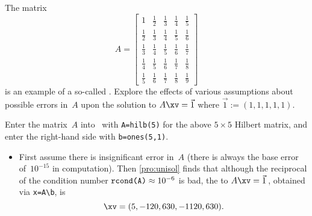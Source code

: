\begin{example} \label{eg:hilb5}
The matrix 
\begin{equation*}
A=\begin{bmatrix} 1&\frac12&\frac13&\frac14&\frac15
\\\frac12&\frac13&\frac14&\frac15&\frac16
\\\frac13&\frac14&\frac15&\frac16&\frac17
\\\frac14&\frac15&\frac16&\frac17&\frac18
\\\frac15&\frac16&\frac17&\frac18&\frac19
\end{bmatrix}
\end{equation*}
is an example of a so-called .
Explore the effects of various assumptions about possible errors in~\(A\) upon the solution to \(A\xv=\vec 1\) where \(\vec1:=(1,1,1,1,1)\).
\begin{solution} 
Enter the matrix~\(A\) into \script\ with \verb|A=hilb(5)| for the above \(5\times5\) Hilbert matrix, and enter the right-hand side with \verb|b=ones(5,1)|.
\begin{itemize}
\item First assume there is insignificant error in~\(A\) (there is always the base error of~\(10^{-15}\) in computation).
Then \cref{pro:unisol} finds that although the reciprocal of the condition number \(\verb|rcond(A)|\approx10^{-6}\) is bad, the  to \(A\xv=\vec1\)\,, obtained via \verb|x=A\b|, is
\begin{equation*}
\xv=(5,-120,630,-1120,630).
\end{equation*}
 
\setbox\ajrqrbox\hbox{}%
\marginajrbox%


\end{itemize}
\end{solution}
\end{example}

